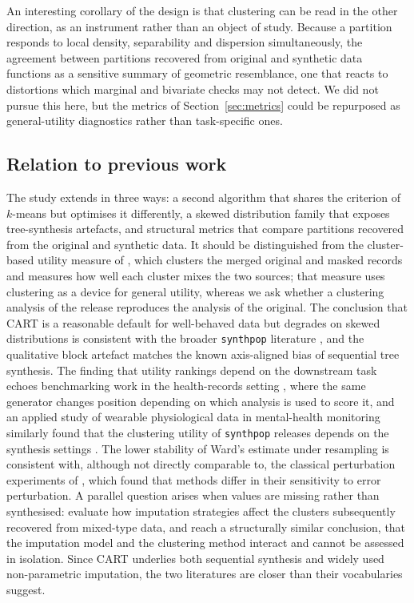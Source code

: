 \documentclass[pdflatex,referee]{sn-jnl}
\begin{document}
An interesting corollary of the design is that clustering can be read in the
other direction, as an instrument rather than an object of study. Because a
partition responds to local density, separability and dispersion
simultaneously, the agreement between partitions recovered from original and
synthetic data functions as a sensitive summary of geometric resemblance, one
that reacts to distortions which marginal and bivariate checks may not detect.
We did not pursue this here, but the metrics of Section~\ref{sec:metrics} could
be repurposed as general-utility diagnostics rather than task-specific ones.

\subsection{Relation to previous work}

The study extends  in three ways: a second algorithm that
shares the criterion of $k$-means but optimises it differently, a skewed
distribution family that exposes tree-synthesis artefacts, and structural
metrics that compare partitions recovered from the original and synthetic
data. It should be distinguished from the cluster-based utility measure of
\citet{woo2009}, which clusters the merged original and masked records and
measures how well each cluster mixes the two sources; that measure uses
clustering as a device for general utility, whereas we ask whether a
clustering analysis of the release reproduces the analysis of the original.
The conclusion that CART is a reasonable default for well-behaved data but
degrades on skewed distributions is consistent with the broader
\texttt{synthpop} literature \citep{nowok2016,snoke2018}, and the qualitative
block artefact matches the known axis-aligned bias of sequential tree
synthesis. The finding that utility rankings depend on the downstream task
echoes benchmarking work in the health-records setting
\citep{yan2022,elemam2022}, where the same generator changes position depending
on which analysis is used to score it, and an applied study of wearable
physiological data in mental-health monitoring similarly found that the
clustering utility of \texttt{synthpop} releases depends on the synthesis
settings \citep{vidiella2025}. The lower stability of Ward's estimate under
resampling is consistent with, although not directly comparable to, the
classical perturbation experiments of \citet{milligan1980}, which found that
methods differ in their sensitivity to error perturbation. A parallel question
arises when values are missing rather than synthesised: \citet{aschenbruck2023}
evaluate how imputation strategies affect the clusters subsequently recovered
from mixed-type data, and reach a structurally similar conclusion, that the
imputation model and the clustering method interact and cannot be assessed in
isolation. Since CART underlies both sequential synthesis and widely used
non-parametric imputation, the two literatures are closer than their
vocabularies suggest.
\end{document}
